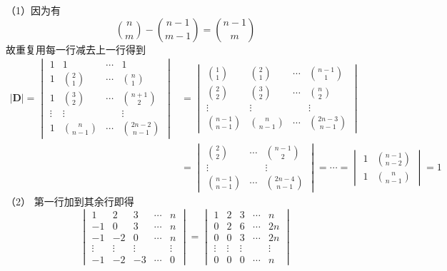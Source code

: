 \begin{solution}
\textup{（1）}因为有
\[
 \binom{n}{m}  - \binom{n - 1}{m - 1} = \binom{n - 1}{m}   
\]
故重复用每一行减去上一行得到
\begin{align*}
	\left|\bm{D}\right|
	=
	\begin{vmatrix}
    1 & 1 & \cdots & 1\\
    1 & \binom{2}{1} & \cdots & \binom{n}{1} \\
    1 & \binom{3}{2} & \cdots & \binom{n + 1}{2} \\
    \vdots & \vdots & & \vdots \\
    1 & \binom{n }{n - 1} & \cdots & \binom{2n - 2}{ n - 1}   
\end{vmatrix}
&= \begin{vmatrix}
	\binom{1}{1} &\binom{2}{1}& \cdots & \binom{n - 1}{1}\\
	\binom{2}{2} & \binom{3}{2}&\cdots & \binom{n}{2}\\
	\vdots &\vdots& &\vdots\\
	\binom{n -1}{n -1}&\binom{n}{n - 1}&\cdots&\binom{2 n  -3}{n - 1}
\end{vmatrix}\\
&=\begin{vmatrix}
	\binom{2}{2} & \cdots & \binom{n-1}{2}\\
	\vdots &&\vdots\\
	\binom{n-1}{n-1}&\cdots&\binom{2n-4}{n-1}
\end{vmatrix}
=\cdots=\begin{vmatrix}
	1&\binom{n-1}{n-2}\\
	1&\binom{n}{n-1}
\end{vmatrix}
=1
\end{align*}
\textup{（2）}
第一行加到其余行即得
\[
\begin{vmatrix}
	1 & 2 & 3 & \cdots & n\\
	-1 & 0 & 3 & \cdots & n\\
	-1 & -2 & 0 & \cdots & n\\
	\vdots & \vdots & \vdots & &\vdots\\
	-1 & -2 & -3 & \cdots & 0
\end{vmatrix}
=
\begin{vmatrix}
	1 & 2 & 3 & \cdots & n\\
	0 & 2 & 6 & \cdots & 2n\\
	0 & 0 & 3 & \cdots & 2n\\
	\vdots & \vdots & \vdots & &\vdots\\
	0 & 0 & 0 & \cdots & n
\end{vmatrix}
\]
\end{solution}
